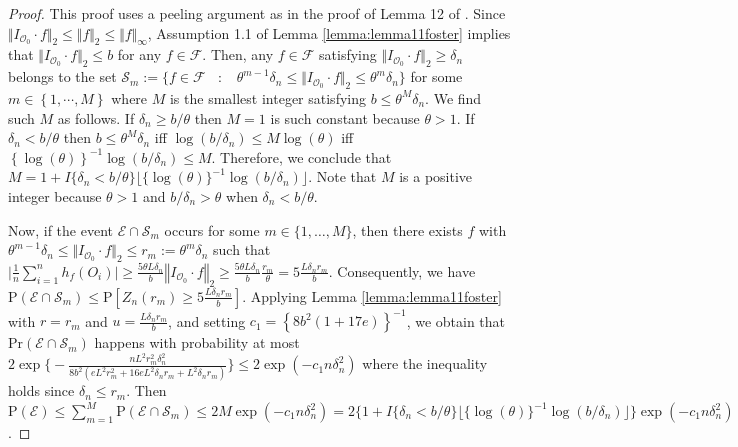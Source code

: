 \documentclass[twoside,11pt]{article}
\newcommand{\mc}{\mathcal}
\begin{document}
\begin{proof}
   This proof uses a peeling argument as in the proof of Lemma 12 of \citet*{foster2023orthogonal}. Since $\Vert I_{\mc{O}_0}\cdot f\Vert_2\le \Vert f\Vert_{2}\le\Vert f\Vert_{\infty}$, Assumption 1.1 of Lemma \ref{lemma:lemma11foster} implies that $\Vert I_{\mc{O}_0}\cdot f\Vert_{2}\le b$ for any $f\in\mc{F}$. Then, any $f\in\mc{F}$ satisfying $\Vert I_{\mc{O}_0}\cdot f\Vert_2\ge \delta_n$ belongs to the set $\mc{S}_m:=\{f\in\mc{F}\text{ }\::\:\text{ }\theta^{m-1}\delta_n\le\Vert I_{\mc{O}_0}\cdot f\Vert_2\le \theta^m\delta_n\}$ for some $m\in\left\{1,\cdots,M\right\}$ where $M$ is the smallest integer satisfying $b\le \theta^M \delta_n$. We find such $M$ as follows. If $\delta_n\ge b/\theta$ then $M=1$ is such constant because $\theta>1$. If $\delta_n<b/\theta$ then $b\le \theta^M \delta_n$ iff $\log(b/\delta_n)\le M\log(\theta)$ iff $\left\{\log(\theta)\right\}^{-1}\log(b/\delta_n)\le M$. Therefore, we conclude that $M=1+I\{\delta_n<b/\theta\}\lfloor\{\log(\theta)\}^{-1}\log(b/\delta_n)\rfloor$. Note that $M$ is a positive integer because $\theta>1$ and $b/\delta_n>\theta$ when $\delta_n<b/\theta$.
    
    Now, if the event $\mc{E}\cap\mc{S}_m$ occurs for some $m\in\{1,\dots,M\}$, then there exists $f$ with $\theta^{m-1}\delta_n\le\Vert I_{\mc{O}_0}\cdot f\Vert_2\le r_m:=\theta^m\delta_n$ such that $\vert\frac{1}{n}\sum_{i=1}^nh_f(O_i) \vert\ge \frac{5\theta L\delta_n}{b}\left\Vert I_{\mc{O}_0}\cdot f\right\Vert_2
    \ge \frac{5\theta L\delta_n}{b} \frac{r_m}{\theta} =5 \frac{L\delta_n r_m}{b}$.
    Consequently, we have $\text{P}\left(\mc{E}\cap\mc{S}_m\right)\le\text{P}\left[Z_n(r_m)\ge5 \frac{L\delta_n r_m}{b}\right]$. Applying Lemma \ref{lemma:lemma11foster} with $r=r_m$ and $u=\frac{L\delta_nr_m}{b}$, and setting $c_1=\left\{8b^2(1+17e)\right\}^{-1}$, we obtain that $\text{Pr}\left(\mc{E}\cap\mc{S}_m\right)$ happens with probability at most $2\exp\Big\{-\frac{nL^2r_m^2\delta_n^2}{8b^2(eL^2r_m^2+16eL^2\delta_nr_m+L^2\delta_nr_m)}\Big\}
    \le 2\exp\left(-c_1n\delta_n^2\right)$ where the inequality holds since $\delta_n\le r_m$. Then $\text{P}(\mc{E})\le\sum_{m=1}^M\text{P}(\mc{E}\cap\mc{S}_m)\le 2M\exp(-c_1 n\delta_n^2)=2\{ 1+I\{\delta_n<b/\theta\}\lfloor\{\log(\theta)\}^{-1}\log(b/\delta_n)\rfloor\}\exp\left(-c_1n\delta_n^2\right)$.
\end{proof}
\end{document}
